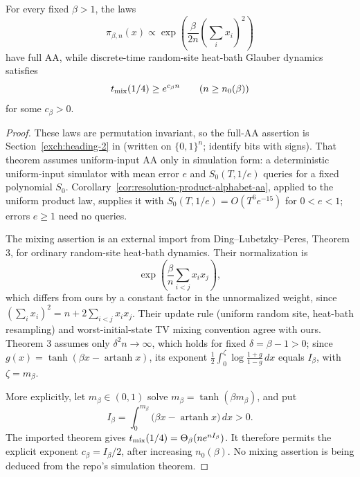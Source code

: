 \begin{proposition}
\label{ian:hard-sector-curie-weiss-sampling}
For every fixed \(\beta>1\), the laws
\[
 \pi_{\beta,n}(x)
 \propto\exp\left(\frac{\beta}{2n}
                    \left(\sum_i x_i\right)^2\right)
\]
have full AA, while discrete-time random-site heat-bath Glauber
dynamics satisfies
\[
 t_{\rm mix}(1/4)\ge e^{c_\beta n}
 \qquad(n\ge n_0(\beta))
\]
for some \(c_\beta>0\).
\end{proposition}

\begin{proof}
These laws are permutation invariant, so the full-AA assertion is
Section~\ref{exch:heading-2} in
 (written on
\(\{0,1\}^n\); identify bits with signs). That theorem assumes
uniform-input AA only in simulation form: a deterministic uniform-input
simulator with mean error \(e\) and \(S_0(T,1/e)\) queries for a fixed
polynomial \(S_0\). Corollary~\ref{cor:resolution-product-alphabet-aa},
applied to the uniform product law, supplies it with
\(S_0(T,1/e)=O(T^6e^{-15})\) for \(0<e<1\); errors \(e\ge1\) need no
queries.

The mixing assertion is an external import from
Ding--Lubetzky--Peres, Theorem 3, for ordinary random-site heat-bath
dynamics. Their normalization is
\[
 \exp\left(\frac{\beta}{n}\sum_{i<j}x_ix_j\right),
\]
which differs from ours by a constant factor in the unnormalized
weight, since \((\sum_i x_i)^2=n+2\sum_{i<j}x_ix_j\).
Their update rule (uniform random site, heat-bath resampling) and worst-initial-state TV mixing convention agree with ours. Theorem 3 assumes only \(\delta^2n\to\infty\), which holds for fixed \(\delta=\beta-1>0\); since \(g(x)=\tanh(\beta x-\operatorname{artanh}x)\), its exponent \(\tfrac12\int_0^\zeta\log\frac{1+g}{1-g}\,dx\) equals \(I_\beta\), with \(\zeta=m_\beta\).

More explicitly, let \(m_\beta\in(0,1)\) solve
\(m_\beta=\tanh(\beta m_\beta)\), and put
\[
 I_\beta=\int_0^{m_\beta}
             \bigl(\beta x-\operatorname{artanh}x\bigr)\,dx>0.
\]
The imported theorem gives
\(t_{\rm mix}(1/4)=\Theta_\beta(n e^{nI_\beta})\).
It therefore permits the explicit exponent
\(c_\beta=I_\beta/2\), after increasing \(n_0(\beta)\).
No mixing assertion is being deduced from the repo's simulation
theorem.
\end{proof}

